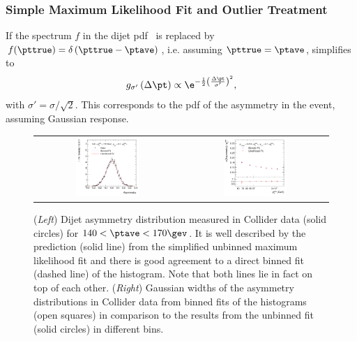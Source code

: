 \subsubsection{Simple Maximum Likelihood Fit and Outlier Treatment}\label{sec:ResFit:DataDriven:SimpleFit}

If the spectrum $f$ in the dijet pdf~ is replaced by \mbox{$f(\pttrue)  = \delta\left(\pttrue - \ptave\right)$}, i.e. assuming \mbox{$\pttrue = \ptave$}, 
 simplifies to
\begin{equation}
\label{eq:ResFit::DijetPdfTransformed:Simple}
  g_{\sigma'}\left(\Delta\pt\right) \propto
  \e^{-\frac{1}{2}\left(\frac{\Delta\pt}{\sigma'}\right)^{2}}, 
\end{equation}
with \mbox{$\sigma' = \sigma/\sqrt{2}$}.
This corresponds to the pdf of the asymmetry in the event, assuming
Gaussian response.

\begin{figure}[ht]
 \centering
  \begin{tabular}{cc}
    \includegraphics[width=0.45\textwidth]{figures/MaxLikeSimple_Data132440-144011_Eta00-13_PtAsymmetry_PtBin4_Pt3Cut3} &
    \includegraphics[width=0.45\textwidth]{figures/MaxLikeSimple_Data132440-144011_Eta00-13_PtAsymmetryWidthBottomRatio_Pt3Cut3} \\
\end{tabular}
 \caption{(\textit{Left}) Dijet asymmetry distribution measured in
    Collider data (solid circles) for \mbox{$140 < \ptave < 170\gev$}.
    It is well described by the prediction (solid line) from the
    simplified unbinned maximum likelihood fit and there is good agreement to a direct binned
    fit (dashed line) of the histogram.
    Note that both lines lie in fact on top of each other.
    (\textit{Right}) Gaussian widths of the asymmetry distributions in
    Collider data from binned fits of the
    histograms (open squares) in comparison to the results from
    the unbinned fit (solid circles) in different \ptave bins.}
  \label{fig:ResFit:DataDriven:Simple}
\end{figure}

